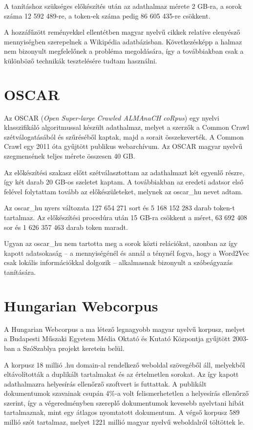 A tanításhoz szükséges előkészítés után az adathalmaz mérete 2 GB-ra, a sorok száma 12 592 489-re, a token-ek száma pedig 86 605 435-re csökkent.

A hozzáfűzött reményekkel ellentétben magyar nyelvű cikkek relatíve elenyésző mennyiségben szerepelnek a Wikipédia adatbázisban. Következésképp a halmaz nem bizonyult megfelelőnek a probléma megoldására, így a továbbiakban csak a különböző technikák tesztelésére tudtam használni.


\section{OSCAR}

Az OSCAR (\textit{Open Super-large Crawled ALMAnaCH coRpus}) \cite{oscar} egy nyelvi klasszifikáló algoritmussal készült adathalmaz, melyet a szerzők a Common Crawl \cite{common} szétválogatásából és szűréséből kaptak, majd a sorait összekeverték. A Common Crawl egy 2011 óta gyűjtött publikus webarchívum. Az OSCAR magyar nyelvű szegmensének teljes mérete összesen 40 GB. 

Az előkészítési szakasz előtt szétválasztottam az adathalmazt két egyenlő részre, így két darab 20 GB-os szeletet kaptam. A továbbiakban az eredeti adatsor első felével folytattam tovább az előkészületeket, melynek az oscar\_hu nevet adtam.

Az oscar\_hu nyers változata 127 654 271 sort és 5 168 152 283 darab token-t tartalmaz. Az előkészítési procedúra után 15 GB-ra csökkent a méret, 63 692 408 sor és 1 626 357 463 darab token maradt.

Ugyan az oscar\_hu nem tartotta meg a sorok közti relációkat, azonban az így kapott adatsokaság – a mennyiségénél és annál a ténynél fogva, hogy a Word2Vec csak lokális információkkal dolgozik – alkalmasnak bizonyult a szóbeágyazás tanítására.

\section{Hungarian Webcorpus}

A Hungarian Webcorpus \cite{hungarian_webcorpus} a ma létező legnagyobb magyar nyelvű korpusz, melyet a Budapesti Műszaki Egyetem Média Oktató és Kutató Központja gyűjtött 2003-ban a SzóSzablya projekt keretein belül.

A korpusz 18 millió .hu domain-al rendelkező weboldal szövegéből áll, melyekből eltávolították a duplikált tartalmakat és az értelmetlen sorokat. Az így kapott adathalmazra helyesírás ellenőrző szoftvert is futtattak. A publikált dokumentumok szavainak csupán 4\%-a volt felismerhetetlen a helyesírás ellenőrző szerint, így a végeredményben szereplő dokumentumok kevesebb nyelvtani hibát tartalmaznak, mint egy átlagos nyomtatott dokumentum. A végső korpusz 589 millió szót tartalmaz, melyet 1221 millió magyar nyelvű weboldalról töltöttek le.

